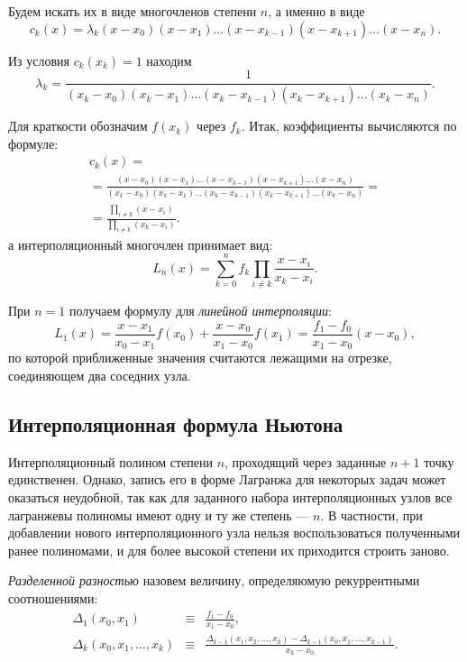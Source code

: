 Будем искать их в виде многочленов степени $n$, а именно в виде
\[
c_{k}(x)=\lambda_{k}(x-x_{0})(x-x_{1})\dots(x-x_{k-1})(x-x_{k+1})\dots(x-x_{n}).
\]


Из условия $c_{k}(x_{k})=1$ находим
\[
\lambda_{k}=\frac{1}{(x_{k}-x_{0})(x_{k}-x_{1})\dots(x_{k}-x_{k-1})(x_{k}-x_{k+1})\dots(x_{k}-x_{n})}.
\]


Для краткости обозначим $f(x_{k})$ через $f_{k}$. Итак, коэффициенты
вычисляются по формуле:
\begin{multline*}
c_{k}(x)=\\ =\frac{(x-x_{0})(x-x_{1})\dots(x-x_{k-1})(x-x_{k+1})\dots(x-x_{n})}{(x_{k}-x_{0})(x_{k}-x_{1})\dots(x_{k}-x_{k-1})(x_{k}-x_{k+1})\dots(x_{k}-x_{n})}=\\ =\frac{\prod_{i\neq
    k}(x-x_{i})}{\prod_{i\neq k}(x_{k}-x_{i})}.
\end{multline*}
а интерполяционный многочлен принимает вид:
\[
L_{n}(x)=\sum_{k=0}^{n}f_{k}\prod_{i\neq k}\frac{x-x_{i}}{x_{k}-x_{i}}.
\]


При $n=1$ получаем формулу для \emph{линейной интерполяции}:
\[
L_{1}(x)=\frac{x-x_{1}}{x_{0}-x_{1}}f(x_{0})+\frac{x-x_{0}}{x_{1}-x_{0}}f(x_{1})=\frac{f_{1}-f_{0}}{x_{1}-x_{0}}(x-x_{0}),
\]
по которой приближенные значения считаются лежащими на отрезке,
соединяющем два соседних узла.

\subsection{Интерполяционная формула Ньютона}

Интерполяционный полином степени $n$, проходящий через заданные $n+1$
точку единственен. Однако, запись его в форме Лагранжа для некоторых
задач может оказаться неудобной, так как для заданного набора
интерполяционных узлов все лагранжевы полиномы имеют одну и ту же
степень --- $n$.  В частности, при добавлении нового интерполяционного
узла нельзя воспользоваться полученными ранее полиномами, и для более
высокой степени их приходится строить заново.

\emph{Разделенной разностью} назовем
величину, определяюмую рекуррентными соотношениями:
\begin{eqnarray*}
\Delta_{1}(x_{0},x_{1}) & \equiv & \frac{f_{1}-f_{0}}{x_{1}-x_{0}},\\
\Delta_{k}(x_{0},x_{1},\dots,x_{k}) & \equiv & \frac{\Delta_{k-1}(x_{1},x_{2},\dots,x_{k})-\Delta_{k-1}(x_{0},x_{1},\dots,x_{k-1})}{x_{k}-x_{0}}.
\end{eqnarray*}


